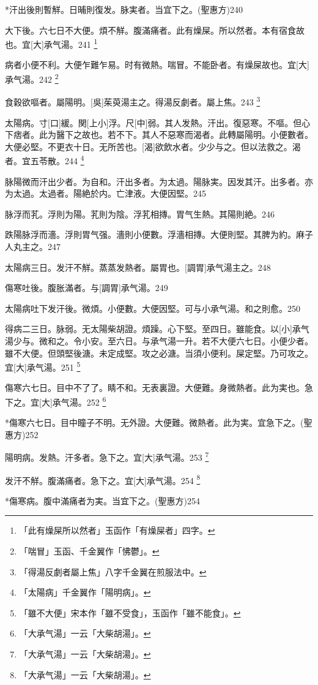 \documentclass[12pt,oneside,UTF8,b5paper]{ctexbook}她她她她她她她
\begin{document}
*汗出後則暫觧。日晡則復发。脉実者。当宜下之。(聖惠方)240

大下後。六七日不大便。煩不觧。腹滿痛者。此有燥屎。所以然者。本有宿食故也。宜[大]承气湯。241
	\footnote{「此有燥屎所以然者」玉函作「有燥屎者」四字。}

病者小便不利。大便乍難乍易。时有微熱。喘冒。不能卧者。有燥屎故也。宜[大]承气湯。242
	\footnote{「喘冒」玉函、千金翼作「怫鬱」。}

食穀欲嘔者。屬陽明。[吳]茱萸湯主之。得湯反劇者。屬上焦。243
	\footnote{「得湯反劇者屬上焦」八字千金翼在煎服法中。}

太陽病。寸[口]緩。関[上小]浮。尺[中]弱。其人发熱。汗出。復惡寒。不嘔。但心下痞者。此为醫下之故也。若不下。其人不惡寒而渴者。此轉屬陽明。小便數者。大便必堅。不更衣十日。无所苦也。[渴]欲飲水者。少少与之。但以法救之。渴者。宜五苓散。244
	\footnote{「太陽病」千金翼作「陽明病」。}

脉陽微而汗出少者。为自和。汗出多者。为太過。陽脉実。因发其汗。出多者。亦为太過。太過者。陽絶於内。亡津液。大便因堅。245

脉浮而芤。浮則为陽。芤則为陰。浮芤相摶。胃气生熱。其陽則絶。246

跌陽脉浮而濇。浮則胃气强。濇則小便數。浮濇相摶。大便則堅。其脾为約。麻子人丸主之。247

太陽病三日。发汗不觧。蒸蒸发熱者。屬胃也。[調胃]承气湯主之。248

傷寒吐後。腹胀滿者。与[調胃]承气湯。249

太陽病吐下发汗後。微煩。小便數。大便因堅。可与小承气湯。和之則愈。250

得病二三日。脉弱。无太陽柴胡證。煩躁。心下堅。至四日。雖能食。以[小]承气湯少与。微和之。令小安。至六日。与承气湯一升。若不大便六七日。小便少者。雖不大便。但頭堅後溏。未定成堅。攻之必溏。当須小便利。屎定堅。乃可攻之。宜[大]承气湯。251
	\footnote{「雖不大便」宋本作「雖不受食」，玉函作「雖不能食」。}

傷寒六七日。目中不了了。睛不和。无表裏證。大便難。身微熱者。此为実也。急下之。宜[大]承气湯。252
	\footnote{「大承气湯」一云「大柴胡湯」。}

*傷寒六七日。目中瞳子不明。无外證。大便難。微熱者。此为実。宜急下之。(聖惠方)252

陽明病。发熱。汗多者。急下之。宜[大]承气湯。253
	\footnote{「大承气湯」一云「大柴胡湯」。}

发汗不觧。腹滿痛者。急下之。宜[大]承气湯。254
	\footnote{「大承气湯」一云「大柴胡湯」。}

*傷寒病。腹中滿痛者为実。当宜下之。(聖惠方)254
\end{document}
